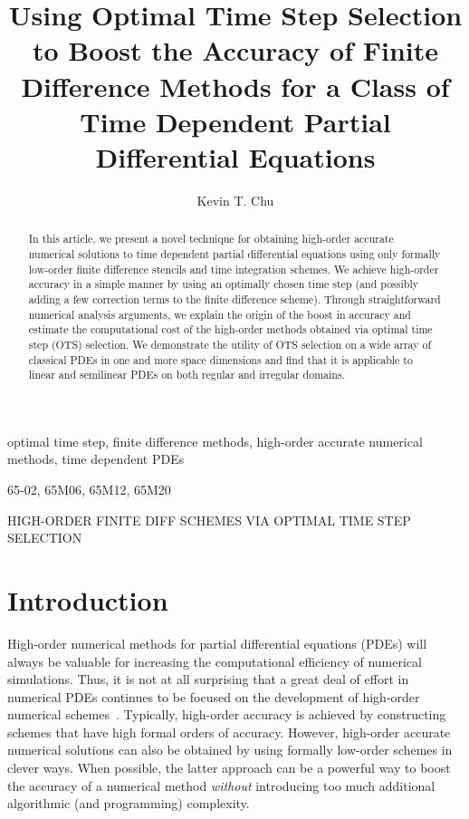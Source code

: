 \documentclass[oneeqnum,onefignum,onetabnum,onethmnum]{siamltex}
\title{Using Optimal Time Step Selection to Boost the Accuracy of
       Finite Difference Methods for a Class of 
       Time Dependent Partial Differential Equations}
\author{
Kevin T. Chu\footnotemark[2] \footnotemark[3]
}
\begin{document}

\maketitle

\renewcommand{\thefootnote}{\fnsymbol{footnote}}

\renewcommand{\thefootnote}{\fnsymbol{footnote}}

\renewcommand{\thefootnote}{\arabic{footnote}}


\begin{abstract}
In this article, we present a novel technique for obtaining high-order
accurate numerical solutions to time dependent partial differential 
equations using only formally low-order finite difference stencils and
time integration schemes.  We achieve high-order accuracy in a simple
manner by using an optimally chosen time step (and possibly adding a few 
correction terms to the finite difference scheme).  Through straightforward 
numerical analysis arguments, we explain the origin of the boost in accuracy 
and estimate the computational cost of the high-order methods obtained via 
optimal time step (OTS) selection.  We demonstrate the utility of OTS 
selection on a wide array of classical PDEs in one and more space dimensions
and find that it is applicable to linear and semilinear PDEs on both regular 
and irregular domains. 
\end{abstract}


\begin{keywords}
optimal time step, finite difference methods, high-order accurate numerical 
methods, time dependent PDEs
\end{keywords}

\begin{AMS}
65-02, 65M06, 65M12, 65M20
\end{AMS}

\pagestyle{myheadings}
\thispagestyle{plain}
         {HIGH-ORDER FINITE DIFF SCHEMES VIA OPTIMAL TIME STEP SELECTION} 


\section*{Introduction}
High-order numerical methods for partial differential equations (PDEs) will 
always be valuable for increasing the computational efficiency of numerical 
simulations.  Thus, it is not at all surprising that a great deal of effort in 
numerical PDEs continues to be focused on the development of high-order 
numerical schemes~\cite{bruger_2005, gibou_2005, ito_2005, shukla_2005, 
shukla_2007}.  
Typically, high-order accuracy is achieved by constructing
schemes that have high formal orders of accuracy.  However, high-order 
accurate numerical solutions can also be obtained by using formally low-order 
schemes in clever ways.  When possible, the latter approach can be a powerful 
way to boost the accuracy of a numerical method \emph{without} introducing too 
much additional algorithmic (and programming) complexity.
\end{document}
